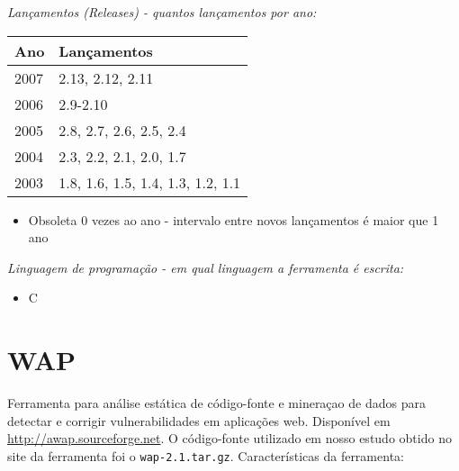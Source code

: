 \begin{description}

  \item {\it Lançamentos ({\it Releases}) - quantos lançamentos por ano:}
    \begin{table}[h!]
      \centering
      \begin{tabular}{| l | l |}
        \hline
        Ano  & Lançamentos                       \\
        \hline
        2007 & 2.13, 2.12, 2.11                  \\
        2006 & 2.9-2.10                          \\
        2005 & 2.8, 2.7, 2.6, 2.5, 2.4           \\
        2004 & 2.3, 2.2, 2.1, 2.0, 1.7           \\
        2003 & 1.8, 1.6, 1.5, 1.4, 1.3, 1.2, 1.1 \\
        \hline
      \end{tabular}
    \end{table}
    \begin{itemize}
      \item Obsoleta $0$ vezes ao ano - intervalo entre novos lançamentos é maior que 1 ano
    \end{itemize}

  \item {\it Linguagem de programação - em qual linguagem a ferramenta é escrita:}
    \begin{itemize}
      \item C
    \end{itemize}

\end{description}

\section{WAP}

Ferramenta para análise estática de código-fonte e mineraçao de dados para
detectar e corrigir vulnerabilidades em aplicações web. Disponível em
\url{http://awap.sourceforge.net}. O código-fonte utilizado em nosso estudo
obtido no site da ferramenta foi o \texttt{wap-2.1.tar.gz}. Características da
ferramenta:

